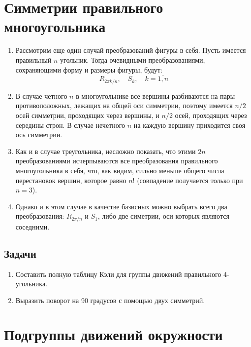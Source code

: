 \section{Симметрии правильного многоугольника}




\begin{enumerate}
\item Рассмотрим еще один случай преобразований фигуры в себя. Пусть имеется правильный $n$-угольник. Тогда очевидными преобразованиями, сохраняющими форму и размеры фигуры, будут:
$$
R_{2\pi k/n},\quad S_k,\quad k=\overline{1,n}
$$
\item В случае четного $n$ в многоугольнике все вершины разбиваются на пары противоположных, лежащих на общей оси симметрии, поэтому имеется $n/2$ осей симметрии, проходящих через вершины, и $n/2$ осей, проходящих через середины строн. В случае нечетного $n$ на каждую вершину приходится своя ось симметрии.
\item Как и в случае треугольника, несложно показать, что этими $2n$ преобразованиями исчерпываются все преобразования правильного многоугольника в себя, что, как видим, сильно меньше общего числа перестановок вершин, которое равно $n!$ (совпадение получается только при $n=3$).
\item Однако и в этом случае в качестве базисных можно выбрать всего два преобразования: $R_{2\pi/n}$ и $S_1$, либо две симетрии, оси которых являются соседними.
\end{enumerate}
\subsection*{Задачи}
\begin{enumerate}
\item Составить полную таблицу Кэли для группы движений правильного 4-угольника.
\item Выразить поворот на 90 градусов с помощью двух симметрий.
\end{enumerate}


\section{Подгруппы движений окружности}


